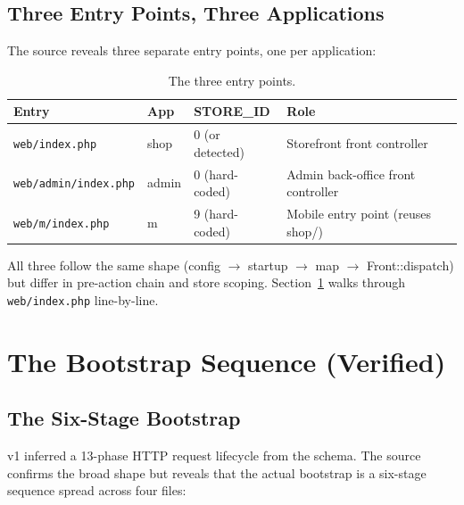 \documentclass[11pt,a4paper]{article}
\begin{document}
\subsection{Three Entry Points, Three Applications}

The source reveals three separate entry points, one per application:

\begin{table}[htbp]
\centering
\caption{The three entry points.}\label{tab:entries}
\small
\begin{tabularx}{\columnwidth}{lllX}
\toprule
\textbf{Entry} & \textbf{App} & \textbf{STORE\_ID} & \textbf{Role} \\
\midrule
\texttt{web/index.php}       & shop & 0 (or detected) & Storefront front controller \\
\texttt{web/admin/index.php} & admin & 0 (hard-coded) & Admin back-office front controller \\
\texttt{web/m/index.php}     & m & 9 (hard-coded) & Mobile entry point (reuses shop/) \\
\bottomrule
\end{tabularx}
\end{table}

All three follow the same shape (config $\to$ startup $\to$ map $\to$
Front::dispatch) but differ in pre-action chain and store scoping.
Section~\ref{sec:bootstrap} walks through \texttt{web/index.php}
line-by-line.

\section{The Bootstrap Sequence (Verified)}\label{sec:bootstrap}

\subsection{The Six-Stage Bootstrap}

v1 inferred a 13-phase HTTP request lifecycle from the schema. The
source confirms the broad shape but reveals that the actual bootstrap
is a six-stage sequence spread across four files:
\end{document}
